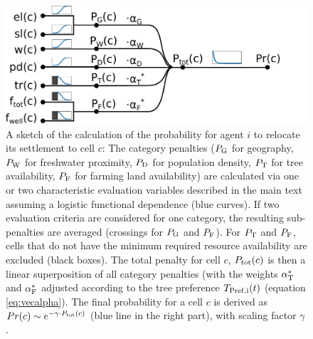 \begin{figure}
	\centering
	\includegraphics[width=1\textwidth]{images/SketchABM2/sketchMoving}
	\caption{A sketch of the calculation of the probability for agent $i$ to relocate its settlement to cell $c$: The category penalties ($P_{\rm G}$ for geography, $P_{\rm W}$ for freshwater proximity, $P_{\rm D}$ for population density, $P_{\rm T}$ for tree availability, $P_{\rm F}$ for farming land availability) are calculated via one or two characteristic evaluation variables described in the main text assuming a logistic functional dependence (blue curves). 
	If two evaluation criteria are considered for one category, the resulting sub-penalties are averaged (crossings for $P_{\rm G}$ and $P_{\rm F}$).
	For $P_{\rm T}$ and $P_{\rm F}$, cells that do not have the minimum required resource availability are excluded (black boxes).
	The total penalty for cell $c$, $P_{\rm tot}(c)$ is then a linear superposition of all category penalties (with the weights $\alpha_{\rm T}^*$ and $\alpha_{\rm F}^*$ adjusted according to the tree preference $T_{\rm Pref, i}(t)$ (equation \ref{eq:vecalpha}).
	The final probability for a cell $c$ is derived as $Pr(c) \sim e^{-\gamma \cdot P_{\rm tot}(c)}$ (blue line in the right part), with scaling factor $\gamma$.} 
	\label{fig:sketchmoving}
\end{figure}




